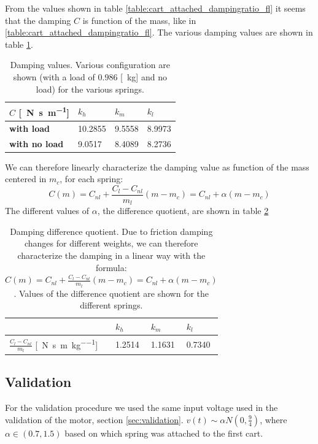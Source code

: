 From the values shown in table \ref{table:cart_attached_dampingratio_fl} it seems that the damping $C$ is function of the mass, like in \ref{table:cart_attached_dampingratio_fl}. The various damping values are shown in table 
\ref{table:cart_attached_damping_fl}.
\begin{table}[!h]
\centering

\begin{tabular}{|l|l|l|l|}
\hline
{$C$ [\SI{}{\newton \second \per \metre}]} & \textbf{$k_h$} & \textbf{$k_m$}   & \textbf{$k_l$}   \\ \hline
\textbf{with load}         &  10.2855    & 9.5558 & 8.9973 \\ \hline
\textbf{with no load}      & 9.0517 &    8.4089 &   8.2736      \\ \hline
\end{tabular}

\caption{Damping values. Various configuration are shown (with a load of $0.986$ [\SI{}{\kilo \gram}] and no load) for the various springs. }
\label{table:cart_attached_damping_fl}
\end{table}

We can therefore linearly characterize the damping value as function of the mass centered in $m_c$, for each spring:
$$C(m)=C_{nl}+ \frac{C_{l}-C_{nl}}{m_{l}}(m -m_{c}) = C_{nl} +\alpha (m-m_{c})$$
The different values of $\alpha$, the difference quotient, are shown in table \ref{table:cart_attached_damping_quotient_fl}

\begin{table}[!h]
\centering

\begin{tabular}{|l|l|l|l|}
\hline
 & \textbf{$k_h$} & \textbf{$k_m$}   & \textbf{$k_l$}   \\ \hline
$\frac{C_{l}-C_{nl}}{m_{l}}$ [\SI{}{\newton \second \per \metre \per \kilo\gram}]       &1.2514   & 1.1631 & 0.7340 \\ \hline
\end{tabular}

\caption{Damping difference quotient. Due to friction damping changes for different weights, we can therefore characterize the damping in a linear way with the formula: $C(m)=C_{nl}+ \frac{C_{l}-C_{nl}}{m_{l}}(m -m_{c})= C_{nl} +\alpha (m-m_{c})$. Values of the difference quotient are shown for the different springs.}
\label{table:cart_attached_damping_quotient_fl}
\end{table}

\subsection{Validation}
For the validation procedure we used the same input voltage used in the validation of the motor, section \ref{sec:validation}. $v(t) \sim \alpha N(0,\frac{9}{4})$, where $\alpha \in (0.7, 1.5)$ based on which spring was attached to the first cart. 
